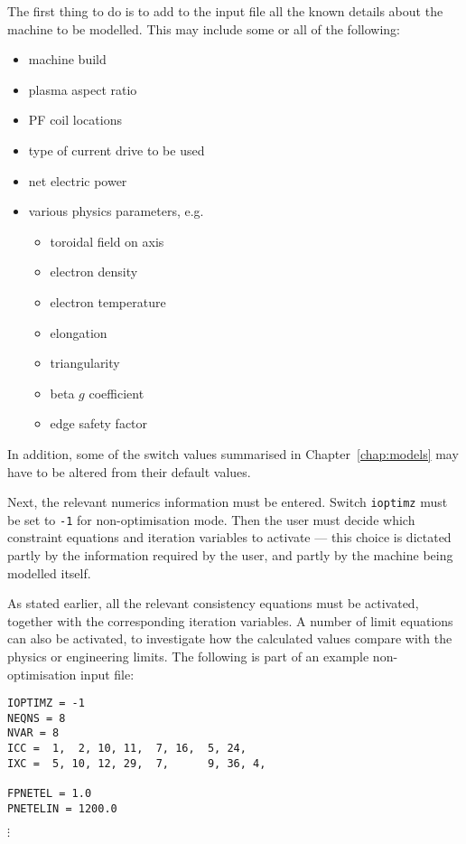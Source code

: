 \documentclass[11pt,a4paper]{report}
\begin{document}
The first thing to do is to add to the input file all the known details about
the machine to be modelled. This may include some or all of the following:
\begin{itemize}
\item machine build
\item plasma aspect ratio
\item PF coil locations
\item type of current drive to be used
\item net electric power
\item various physics parameters, e.g.
\begin{itemize}
\item toroidal field on axis
\item electron density
\item electron temperature
\item elongation
\item triangularity
\item beta $g$ coefficient
\item edge safety factor
\end{itemize}
\end{itemize}

In addition, some of the switch values summarised in Chapter~\ref{chap:models}
may have to be altered from their default values.

Next, the relevant numerics information must be entered. Switch
\texttt{ioptimz} must be set to \texttt{-1} for non-optimisation mode. Then
the user must decide which constraint equations and iteration variables to
activate --- this choice is dictated partly by the information required by the
user, and partly by the machine being modelled itself.

As stated earlier, all the relevant consistency equations must be activated,
together with the corresponding iteration variables. A number of limit
equations can also be activated, to investigate how the calculated values
compare with the physics or engineering limits.  The following is part of an
example non-optimisation input file:
\begin{verbatim}
IOPTIMZ = -1
NEQNS = 8
NVAR = 8
ICC =  1,  2, 10, 11,  7, 16,  5, 24,
IXC =  5, 10, 12, 29,  7,      9, 36, 4,

FPNETEL = 1.0
PNETELIN = 1200.0
\end{verbatim}
\vspace{-6mm}
$\vdots$
\end{document}
